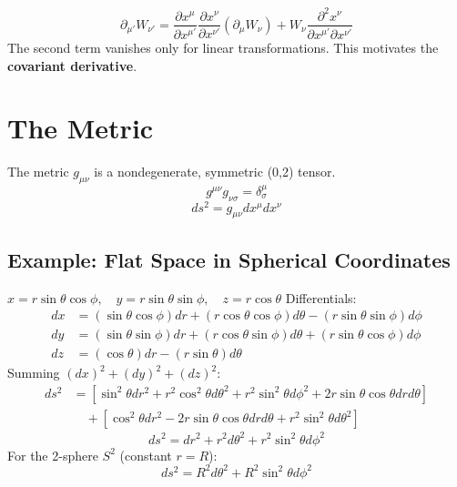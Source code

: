 \documentclass[11pt, a4paper]{report}
\begin{document}
\begin{equation} \partial_{\mu'} W_{\nu'} = \frac{\partial x^\mu}{\partial x^{\mu'}} \frac{\partial x^\nu}{\partial x^{\nu'}} (\partial_\mu W_\nu) + W_\nu \frac{\partial^2 x^\nu}{\partial x^{\mu'} \partial x^{\nu'}} \end{equation}
The second term vanishes only for linear transformations. This motivates the \textbf{covariant derivative}.

\section{The Metric}
The metric $g_{\mu\nu}$ is a nondegenerate, symmetric (0,2) tensor.
\begin{equation} g^{\mu\nu} g_{\nu\sigma} = \delta^\mu_\sigma \end{equation}
\begin{equation} ds^2 = g_{\mu\nu} dx^\mu dx^\nu \end{equation}

\subsection*{Example: Flat Space in Spherical Coordinates}
$x = r \sin\theta \cos\phi, \quad y = r \sin\theta \sin\phi, \quad z = r \cos\theta$
Differentials:
\begin{align*}
dx &= (\sin\theta\cos\phi)dr + (r\cos\theta\cos\phi)d\theta - (r\sin\theta\sin\phi)d\phi \\
dy &= (\sin\theta\sin\phi)dr + (r\cos\theta\sin\phi)d\theta + (r\sin\theta\cos\phi)d\phi \\
dz &= (\cos\theta)dr - (r\sin\theta)d\theta
\end{align*}
Summing $(dx)^2 + (dy)^2 + (dz)^2$:
\begin{align*}
ds^2 &= \left[ \sin^2\theta dr^2 + r^2\cos^2\theta d\theta^2 + r^2\sin^2\theta d\phi^2 + 2r\sin\theta\cos\theta dr d\theta \right] \\
& \quad + \left[ \cos^2\theta dr^2 - 2r\sin\theta\cos\theta dr d\theta + r^2\sin^2\theta d\theta^2 \right]
\end{align*}
\begin{equation} ds^2 = dr^2 + r^2 d\theta^2 + r^2\sin^2\theta d\phi^2 \end{equation}
For the 2-sphere $S^2$ (constant $r=R$):
\begin{equation} ds^2 = R^2 d\theta^2 + R^2\sin^2\theta d\phi^2 \end{equation}
\end{document}
